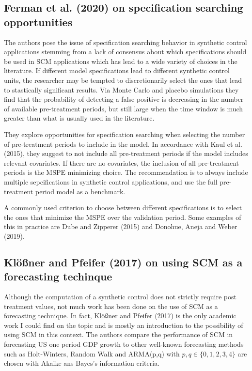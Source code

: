 \documentclass[12pt,a4paper,draft]{article}
\begin{document}
\subsection{Ferman et al. (2020) on specification searching opportunities}

The authors pose the issue of specification searching behavior in synthetic 
control applications stemming from a lack of consensus about which specifications should 
be used in SCM applications which has lead to a wide variety of choices in the 
literature. If different model specifications lead to different synthetic control 
units, the researcher may be tempted to discretionarily select the ones that lead 
to stastically significant results. Via Monte Carlo and placebo simulations they 
find that the probability of detecting a false positive is decreasing in the 
number of available pre-treatment periods, but still large when the time window 
is much greater than what is usually used in the literature.

They explore opportunities for specification searching when selecting the number 
of pre-treatment periods to include in the model. In accordance with Kaul et al.
(2015), they suggest to not include all pre-treatment periods if the model 
includes relevant covariates. If there are no covariates, the inclusion of all 
pre-treatment periods is the MSPE minimizing choice. The recommendation is to 
always include multiple sepcifications in synthetic control applications, and 
use the full pre-treatment period model as a benchmark.

A commonly used criterion to choose between different specifications is to 
select the ones that minimize the MSPE over the validation period. Some examples 
of this in practice are Dube and Zipperer (2015) and Donohue, Aneja and Weber 
(2019).




\subsection{Klößner and Pfeifer (2017) on using SCM as a forecasting techinque}
Although the computation of a synthetic control does not strictly require post treatment
values, not much work has been done on the use of SCM as a forecasting technique.
In fact, Klößner and Pfeifer (2017) is the only academic work I could find on the 
topic and is mostly an introduction to the possibility of using SCM in this context. 
The authors compare the performance of SCM in forecasting US one period GDP growth 
to other well-known forecasting methods such as Holt-Winters, Random Walk and 
ARMA(p,q) with $p,q\in\{ 0,1,2,3,4\}$ are chosen with Akaike ans Bayes's information 
criteria.
\end{document}
